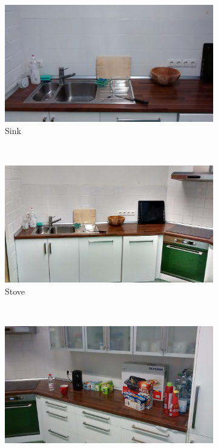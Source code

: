 \documentclass{article}
\begin{document}
{\begin{figure}
\begin{subfigure}[b]{0.3\textwidth}
        \includegraphics[width=\textwidth]{images/sink.jpg}
        \caption{Sink}
        \label{fig:sink}
    \end{subfigure}
    ~ %
    \begin{subfigure}[b]{0.3\textwidth}
        \includegraphics[width=\textwidth]{images/stove.jpg}
        \caption{Stove}
        \label{fig:stove}
    \end{subfigure}
    ~ %
    \begin{subfigure}[b]{0.3\textwidth}
        \includegraphics[width=\textwidth]{images/counter-top.jpg}

\end{subfigure}
\end{figure}}
\end{document}
